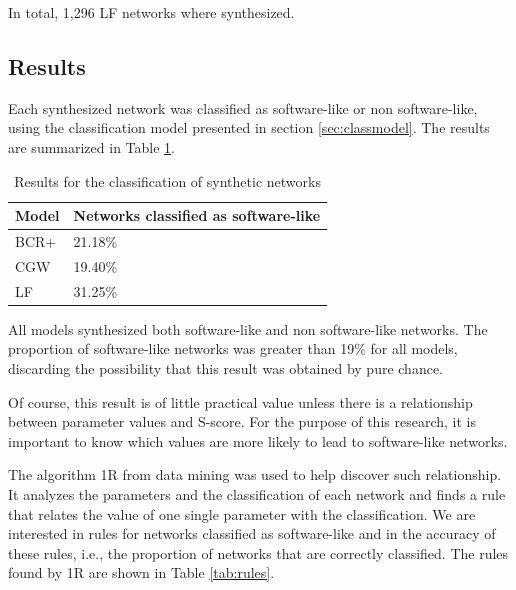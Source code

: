 In total, 1,296 LF networks where synthesized.

\subsection{Results}

Each synthesized network was classified as software-like or non software-like,
using the classification model presented in section \ref{sec:classmodel}. The
results are summarized in Table \ref{tab:results}. 

\begin{table}
\caption{Results for the classification of synthetic networks}
\centering
\begin{tabular}{|l|l|}
\hline
Model & Networks classified as software-like \\
\hline 
\hline
BCR+ & 21.18\% \\ %
\hline
CGW  & 19.40\% \\  %
\hline
LF   & 31.25\% \\ %
\hline
\end{tabular}
\label{tab:results}
\end{table}

All models synthesized both software-like and non software-like networks. The
proportion of software-like networks was greater than 19\% for all models,
discarding the possibility that this result was obtained by pure chance.

%
%
%
%

Of course, this result is of little practical value unless there is a
relationship between parameter values and S-score. For the purpose of this
research, it is important to know which values are more likely to lead to
software-like networks.

The algorithm 1R from data mining was used to help discover such relationship.
It analyzes the parameters and the classification of each network and finds a
rule that relates the value of one single parameter with the classification. We
are interested in rules for networks classified as software-like and in the
accuracy of these rules, i.e., the proportion of networks that are correctly
classified. The rules found by 1R are shown in Table \ref{tab:rules}.

